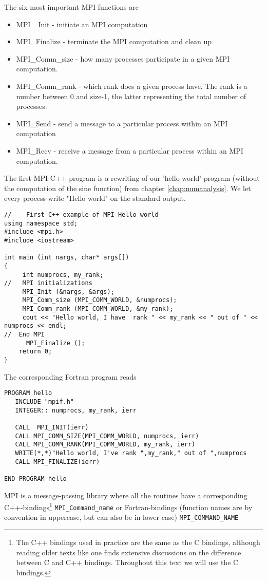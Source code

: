 The six  most important MPI functions are 
\begin{itemize}
\item MPI\_ Init - initiate an MPI computation
\item MPI\_Finalize - terminate the MPI computation and clean up
\item MPI\_Comm\_size - how many processes participate in a given MPI computation.
\item MPI\_Comm\_rank - which rank does a given process have. 
The rank is a number between 0 and size-1, the latter representing
the total number of processes.
\item MPI\_Send - send a message to a particular process within an MPI
computation
\item MPI\_Recv - receive a message from a particular process within an MPI computation.
\end{itemize}

The first MPI C++ program  is a rewriting of our 'hello world' program 
(without the computation of the sine function) 
from chapter \ref{chap:numanalysis}.
We let every process write "Hello world" on the standard output.
\lstset{language=c++}
\begin{lstlisting}[title={\url{http://folk.uio.no/mhjensen/compphys/programs/chapter04/program2.cpp}}]
//    First C++ example of MPI Hello world
using namespace std;
#include <mpi.h>
#include <iostream>

int main (int nargs, char* args[])
{
     int numprocs, my_rank;
//   MPI initializations
     MPI_Init (&nargs, &args);
     MPI_Comm_size (MPI_COMM_WORLD, &numprocs);
     MPI_Comm_rank (MPI_COMM_WORLD, &my_rank);
     cout << "Hello world, I have  rank " << my_rank << " out of " << numprocs << endl;
//  End MPI
      MPI_Finalize ();
    return 0;
}
\end{lstlisting}
The corresponding Fortran program reads
\lstset{language=[90]Fortran}
\begin{lstlisting}
PROGRAM hello
   INCLUDE "mpif.h"
   INTEGER:: numprocs, my_rank, ierr

   CALL  MPI_INIT(ierr)
   CALL MPI_COMM_SIZE(MPI_COMM_WORLD, numprocs, ierr)
   CALL MPI_COMM_RANK(MPI_COMM_WORLD, my_rank, ierr)
   WRITE(*,*)"Hello world, I've rank ",my_rank," out of ",numprocs
   CALL MPI_FINALIZE(ierr)

END PROGRAM hello
\end{lstlisting}
MPI is a message-passing library where all the routines
have a corresponding C++-bindings\footnote{The C++ bindings used in practice are the same as the C bindings, 
although reading older texts like \cite{mpiref,gropp1999,cmpi} one finds
extensive discussions on the difference between C and C++ bindings. 
Throughout this text we will use the C bindings.} \lstinline{MPI_Command_name} or 
Fortran-bindings (function names are by convention in uppercase, but can also be in lower case) \lstinline{MPI_COMMAND_NAME}

